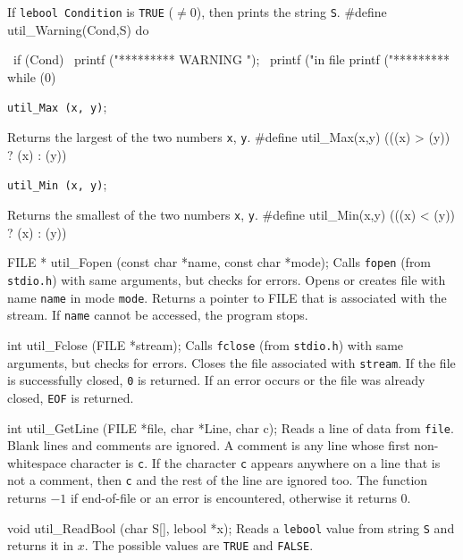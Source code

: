  \tab  If {\tt lebool Condition} is {\tt TRUE} ($\not = 0$),
 then prints the string {\tt S}.
 \endtab
\code
\hide
#define util_Warning(Cond,S) do { \
   if (Cond) { \
      printf ("*********  WARNING "); \
      printf ("in file  %
      printf ("*********  %
   } while (0)
\endhide
\endcode


\noindent 
{\tt util\_Max (x, y)};

 \tab  Returns the largest of the two numbers {\tt  x}, {\tt y}.
 \endtab
\code
\hide
#define util_Max(x,y) (((x) > (y)) ? (x) : (y))
\endhide
\endcode


\noindent 
{\tt util\_Min (x, y)};

 \tab  Returns the smallest of the two numbers {\tt  x}, {\tt y}.
 \endtab
\code
\hide
#define util_Min(x,y) (((x) < (y)) ? (x) : (y))
\endhide
\endcode



\code

FILE * util_Fopen (const char *name, const char *mode);
\endcode
  \tab 
  Calls {\tt fopen} (from {\tt stdio.h}) with same arguments, but checks 
  for errors.
  Opens or creates file with name {\tt name} in mode {\tt mode}. Returns a 
  pointer to 
  FILE that is associated with the stream. If {\tt name} cannot be accessed, 
  the program
  stops. 
 \endtab
\code


int util_Fclose (FILE *stream);
\endcode
  \tab 
   Calls {\tt fclose} (from {\tt stdio.h}) with same arguments, but checks 
   for errors.
   Closes the file associated with {\tt stream}. If the file is successfully 
   closed, {\tt 0}
   is returned. If an error occurs or the file was already closed, {\tt EOF} 
   is returned.
 \endtab
\code


int util_GetLine (FILE *file, char *Line, char c);
\endcode
  \tab
  Reads a line of data from {\tt file}. Blank lines and comments are
  ignored. A comment is any line whose first non-whitespace character
  is {\tt c}. If the character {\tt c} appears anywhere on a line that is
  not a comment, then  {\tt c} and the rest of the line are ignored too. 
  The function returns $-1$ if end-of-file or an error is encountered,
  otherwise it returns 0.
  \endtab
\code


void util_ReadBool (char S[], lebool *x);
\endcode
  \tab
  Reads a {\tt lebool} value from string {\tt S} and returns it in  $x$.
  The possible values are  {\tt TRUE} and  {\tt FALSE}.
  \endtab
\code


}
